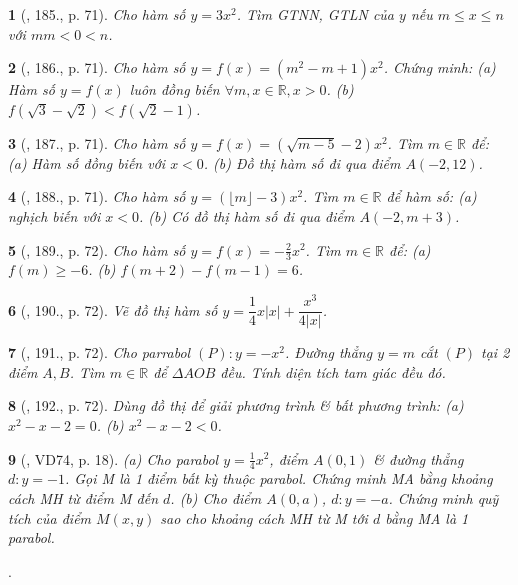 \documentclass{article}
\newtheorem{baitoan}{}
\begin{document}
\begin{baitoan}[\cite{Tuyen_Toan_9_old}, 185., p. 71]
	Cho hàm số $y = 3x^2$. Tìm {\rm GTNN, GTLN} của $y$ nếu $m\le x\le n$ với $mm < 0 < n$.
\end{baitoan}

\begin{baitoan}[\cite{Tuyen_Toan_9_old}, 186., p. 71]
	Cho hàm số $y = f(x) = (m^2 - m + 1)x^2$. Chứng minh: (a) Hàm số $y = f(x)$ luôn đồng biến $\forall m,x\in\mathbb{R},x > 0$. (b) $f(\sqrt{3} - \sqrt{2}) < f(\sqrt{2} - 1)$.
\end{baitoan}

\begin{baitoan}[\cite{Tuyen_Toan_9_old}, 187., p. 71]
	Cho hàm số $y = f(x) = (\sqrt{m - 5} - 2)x^2$. Tìm $m\in\mathbb{R}$ để: (a) Hàm số đồng biến với $x < 0$. (b) Đồ thị hàm số đi qua điểm $A(-2,12)$.
\end{baitoan}

\begin{baitoan}[\cite{Tuyen_Toan_9_old}, 188., p. 71]
	Cho hàm số $y = (\lfloor m\rfloor - 3)x^2$. Tìm $m\in\mathbb{R}$ để hàm số: (a) nghịch biến với $x < 0$. (b) Có đồ thị hàm số đi qua điểm $A(-2,m + 3)$.
\end{baitoan}

\begin{baitoan}[\cite{Tuyen_Toan_9_old}, 189., p. 72]
	Cho hàm số $y = f(x) = -\frac{2}{3}x^2$. Tìm $m\in\mathbb{R}$ để: (a) $f(m)\ge-6$. (b) $f(m + 2) - f(m - 1) = 6$.
\end{baitoan}

\begin{baitoan}[\cite{Tuyen_Toan_9_old}, 190., p. 72]
	Vẽ đồ thị hàm số $y = \dfrac{1}{4}x|x| + \dfrac{x^3}{4|x|}$.
\end{baitoan}

\begin{baitoan}[\cite{Tuyen_Toan_9_old}, 191., p. 72]
	Cho parrabol $(P):y = -x^2$. Đường thẳng $y = m$ cắt $(P)$ tại 2 điểm $A,B$. Tìm $m\in\mathbb{R}$ để $\Delta AOB$ đều. Tính diện tích tam giác đều đó.
\end{baitoan}

\begin{baitoan}[\cite{Tuyen_Toan_9_old}, 192., p. 72]
	Dùng đồ thị để giải phương trình \& bất phương trình: (a) $x^2 - x - 2 = 0$. (b) $x^2 - x - 2 < 0$.
\end{baitoan}

\begin{baitoan}[\cite{Binh_Toan_9_tap_2}, VD74, p. 18]
	(a) Cho parabol $y = \frac{1}{4}x^2$, điểm $A(0,1)$ \& đường thẳng $d:y = -1$. Gọi M là 1 điểm bất kỳ thuộc parabol. Chứng minh MA bằng khoảng cách MH từ điểm M đến $d$. (b) Cho điểm $A(0,a)$, $d:y = -a$. Chứng minh quỹ tích của điểm $M(x,y)$ sao cho khoảng cách MH từ M tới $d$ bằng MA là 1 parabol.
\end{baitoan}
\noindent\cite[235., p. 19, 236., p. 20]{Binh_Toan_9_tap_2}.
\end{document}
